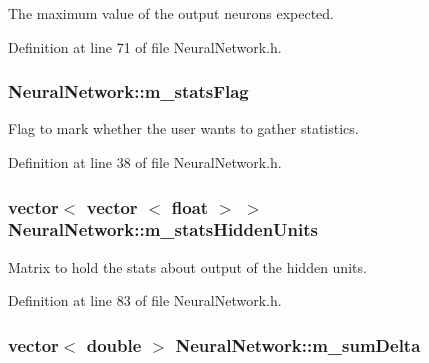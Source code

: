 The maximum value of the output neurons expected. 



Definition at line 71 of file Neural\+Network.\+h.

\subsubsection[{\texorpdfstring{m\+\_\+stats\+Flag}{m_statsFlag}}]{ Neural\+Network\+::m\+\_\+stats\+Flag\hspace{0.3cm}{\ttfamily [protected]}}\hypertarget{classNeuralNetwork_accd035b1b93fd424025aeb4b40a31394}{}\label{classNeuralNetwork_accd035b1b93fd424025aeb4b40a31394}


Flag to mark whether the user wants to gather statistics. 



Definition at line 38 of file Neural\+Network.\+h.

\subsubsection[{\texorpdfstring{m\+\_\+stats\+Hidden\+Units}{m_statsHiddenUnits}}]{\setlength{\rightskip}{0pt plus 5cm}vector$<$ vector $<$ float $>$ $>$ Neural\+Network\+::m\+\_\+stats\+Hidden\+Units\hspace{0.3cm}{\ttfamily [protected]}}\hypertarget{classNeuralNetwork_a15f7c03ca694dadc97a4290711ca2101}{}\label{classNeuralNetwork_a15f7c03ca694dadc97a4290711ca2101}


Matrix to hold the stats about output of the hidden units. 



Definition at line 83 of file Neural\+Network.\+h.

\subsubsection[{\texorpdfstring{m\+\_\+sum\+Delta}{m_sumDelta}}]{\setlength{\rightskip}{0pt plus 5cm}vector$<$ double $>$ Neural\+Network\+::m\+\_\+sum\+Delta\hspace{0.3cm}{\ttfamily [protected]}}\hypertarget{classNeuralNetwork_ac447314a2315cd10f63b0b330857024a}{}\label{classNeuralNetwork_ac447314a2315cd10f63b0b330857024a}


